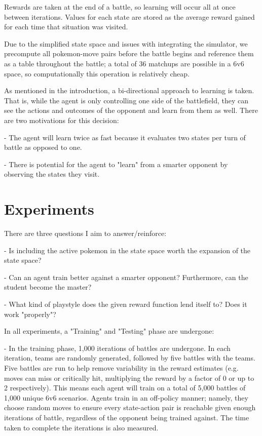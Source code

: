 \documentclass{article}
\begin{document}
\quad	Rewards are taken at the end of a battle, so learning will occur all at once between iterations. Values for each state are stored as the average reward gained for each time that situation was visited.

\quad Due to the simplified state space and issues with integrating the simulator, we precompute all pokemon-move pairs before the battle begins and reference them as a table throughout the battle; a total of 36 matchups are possible in a 6v6 space, so computationally this operation is relatively cheap.

\quad	As mentioned in the introduction, a bi-directional approach to learning is taken. That is, while the agent is only controlling one side of the battlefield, they can see the actions and outcomes of the opponent and learn from them as well. There are two motivations for this decision:

\quad\quad - The agent will learn twice as fast because it evaluates two states per turn of battle as opposed to one.

\quad\quad - There is potential for the agent to "learn" from a smarter opponent by observing the states they visit.


\section{Experiments}
\label{sec:experiment}

\quad	There are three questions I aim to answer/reinforce:

\quad\quad - Is including the active pokemon in the state space worth the expansion of the state space?

\quad\quad - Can an agent train better against a smarter opponent? Furthermore, can the student become the master?

\quad\quad - What kind of playstyle does the given reward function lend itself to? Does it work "properly"?

\quad In all experiments, a "Training" and "Testing" phase are undergone:

\quad\quad - In the training phase, 1,000 iterations of battles are undergone. In each iteration, teams are randomly generated, followed by five battles with the teams. Five battles are run to help remove variability in the reward estimates (e.g. moves can miss or critically hit, multiplying the reward by a factor of 0 or up to 2 respectively). This means each agent will train on a total of 5,000 battles of 1,000 unique 6v6 scenarios. Agents train in an off-policy manner; namely, they choose random moves to ensure every state-action pair is reachable given enough iterations of battle, regardless of the opponent being trained against. The time taken to complete the iterations is also measured.
\end{document}
